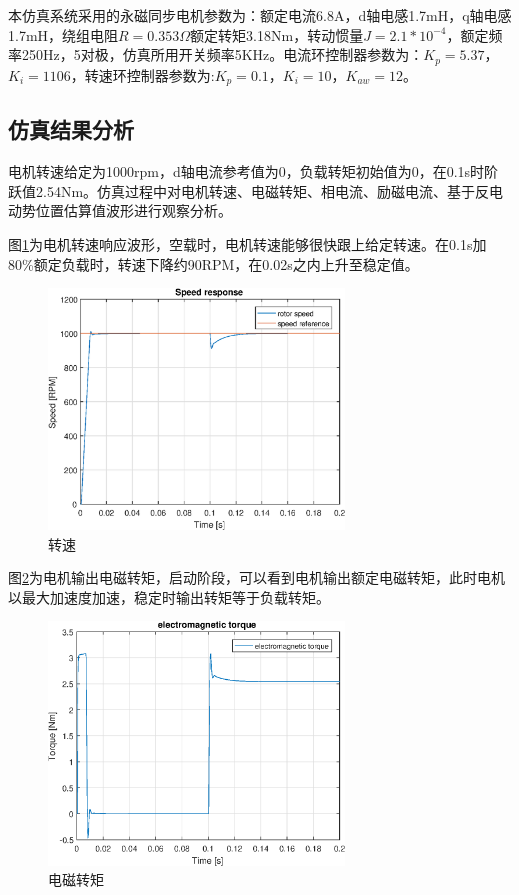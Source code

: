 本仿真系统采用的永磁同步电机参数为：额定电流6.8A，d轴电感1.7mH，q轴电感1.7mH，绕组电阻$R=0.353\Omega$额定转矩3.18Nm，转动惯量$J=2.1*10^{-4}$，额定频率250Hz，5对极，仿真所用开关频率5KHz。电流环控制器参数为：$K_{p}=5.37$，$K_{i}=1106$，转速环控制器参数为:$K_{p}=0.1$，$K_{i}=10$，$K_{aw}=12$。

\subsection{仿真结果分析}
电机转速给定为1000rpm，d轴电流参考值为0，负载转矩初始值为0，在0.1s时阶跃值2.54Nm。仿真过程中对电机转速、电磁转矩、相电流、励磁电流、基于反电动势位置估算值波形进行观察分析。

图\ref{fig:speed}为电机转速响应波形，空载时，电机转速能够很快跟上给定转速。在0.1s加80\%额定负载时，转速下降约90RPM，在0.02s之内上升至稳定值。
\begin{figure}[H]
	\centering
	\includegraphics[width=0.7\textwidth]{figs/speed.eps}
	\caption{转速}
	\label{fig:speed}
\end{figure}
图\ref{fig:torque}为电机输出电磁转矩，启动阶段，可以看到电机输出额定电磁转矩，此时电机以最大加速度加速，稳定时输出转矩等于负载转矩。
\begin{figure}[H]
	\centering
	\includegraphics[width=0.7\textwidth]{figs/torque.eps}
	\caption{电磁转矩}
	\label{fig:torque}
\end{figure}
